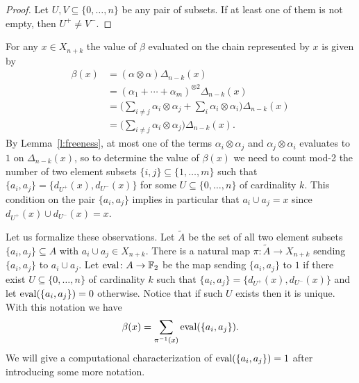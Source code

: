 \begin{proof}
	Let $U, V \subseteq \{0, \dots, n\}$ be any pair of subsets. If at least one of them is not empty, then $U^+ \neq V^-$.
\end{proof}

For any $x \in X_{n+k}$ the value of $\beta$ evaluated on the chain represented by $x$ is given by 
\begin{align*}
\beta(x) & =
(\alpha \otimes \alpha) \Delta_{n-k}(x) \\ & =
(\alpha_1 + \cdots + \alpha_m)^{\otimes 2} \Delta_{n-k}(x) \\ & =
\Big(\sum_{i \neq j} \alpha_i \otimes \alpha_j + \sum_{i} \alpha_i \otimes \alpha_i \Big)
\Delta_{n-k}(x) \\ & =
\Big(\sum_{i \neq j} \alpha_i \otimes \alpha_j\Big)
\Delta_{n-k}(x).
\end{align*}
By Lemma~\ref{l:freeness}, at most one of the terms $\alpha_i \otimes \alpha_j$ and $\alpha_j \otimes \alpha_i$ evaluates to $1$ on $\Delta_{n-k}(x)$, so to determine the value of $\beta(x)$ we need to count mod-2 the number of two element subsets $\{i,j\} \subseteq \{1,\dots, m\}$ such that $\{a_i, a_j\} = \{d_{U^+}(x), d_{U^-}(x)\}$ for some $U \subseteq \{0, \dots, n\}$ of cardinality $k$.
This condition on the pair $\{a_i, a_j\}$ implies in particular that $a_i \cup a_j = x$ since $d_{U^+}(x) \cup d_{U^-}(x) = x$.

Let us formalize these observations.
Let $\widetilde{A}$ be the set of all two element subsets $\{a_i, a_j\} \subseteq A$ with $a_i \cup a_j \in X_{n+k}$.
There is a natural map $\pi \colon \widetilde{A} \to X_{n+k}$ sending $\{a_i, a_j\}$ to $a_i \cup a_j$.
Let $\operatorname{eval} \colon A \to \mathbb{F}_2$ be the map sending $\{a_i, a_j\}$ to $1$ if there exist $U \subseteq \{0,\dots,n\}$ of cardinality $k$ such that $\{a_i, a_j\} = \{d_{U^+}(x), d_{U^-}(x)\}$ and let $\operatorname{eval}(\{a_i, a_j\}) = 0$ otherwise.
Notice that if such $U$ exists then it is unique.
With this notation we have
\begin{equation*}
\beta(x) = \sum_{\pi^{-1}(x)} \operatorname{eval}(\{a_i, a_j\}).
\end{equation*}
We will give a computational characterization of $\operatorname{eval}(\{a_i, a_j\}) = 1$ after introducing some more notation.

